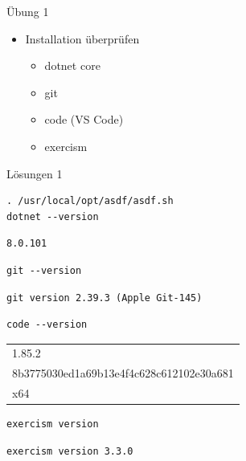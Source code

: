 \documentclass[t]{beamer}
\begin{document}
\begin{frame}[label={sec:orga1b5fe3}]{Übung 1}
\begin{itemize}
\item Installation überprüfen
\begin{itemize}
\item dotnet core
\item git
\item code (VS Code)
\item exercism
\end{itemize}
\end{itemize}
\end{frame}

\begin{frame}[label={sec:org6ff8284},fragile]{Lösungen 1}
 \scriptsize
\begin{verbatim}
. /usr/local/opt/asdf/asdf.sh
dotnet --version
\end{verbatim}

\begin{verbatim}
8.0.101
\end{verbatim}


\begin{verbatim}
git --version
\end{verbatim}

\begin{verbatim}
git version 2.39.3 (Apple Git-145)
\end{verbatim}



\begin{verbatim}
code --version
\end{verbatim}

\begin{tabular}{l}
1.85.2\\[0pt]
8b3775030ed1a69b13e4f4c628c612102e30a681\\[0pt]
x64\\[0pt]
\end{tabular}

\begin{verbatim}
exercism version
\end{verbatim}

\begin{verbatim}
exercism version 3.3.0
\end{verbatim}
\end{frame}
\end{document}
